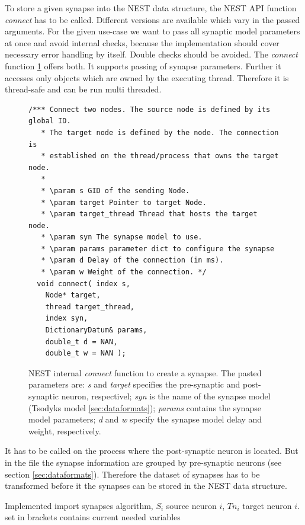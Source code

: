 To store a given synapse into the NEST data structure,
the NEST API function \emph{connect} has to be called.  
Different versions are available which vary in the passed arguments.
For the given use-case we want to pass all synaptic model parameters at once and
avoid internal checks, because the implementation should cover necessary error handling by 
itself. Double checks should be avoided.
The \emph{connect} function \ref{code:connect} offers both.
It supports passing of synapse parameters.
Further it accesses only objects which are owned by the executing thread. 
Therefore it is thread-safe and can be run multi threaded.
\begin{figure}[ht!]
\begin{lstlisting}[style=cppcode]
/*** Connect two nodes. The source node is defined by its global ID.
   * The target node is defined by the node. The connection is
   * established on the thread/process that owns the target node.
   *
   * \param s GID of the sending Node.
   * \param target Pointer to target Node.
   * \param target_thread Thread that hosts the target node.
   * \param syn The synapse model to use.
   * \param params parameter dict to configure the synapse
   * \param d Delay of the connection (in ms).
   * \param w Weight of the connection. */
  void connect( index s,
    Node* target,
    thread target_thread,
    index syn,
    DictionaryDatum& params,
    double_t d = NAN,
    double_t w = NAN );
\end{lstlisting}
\caption{NEST internal \emph{connect} function to create a synapse. The pasted parameters are:
\emph{s} and \emph{target} specifies the pre-synaptic and post-synaptic neuron, respectivel;
\emph{syn} is the name of the synapse model (Tsodyks model \ref{sec:dataformats});
\emph{params} contains the synapse model parameters;
\emph{d} and \emph{w} specify the synapse model delay and weight, respectively.}
\label{code:connect}
\end{figure}
It has to be called on the process where the post-synaptic neuron is located.
But in the file the synapse information are grouped by pre-synaptic neurons (see section \ref{sec:dataformats}).
Therefore the dataset of synapses has to be transformed before it the synapses can be stored in the NEST data structure.
\begin{algorithm}[ht!]
	\caption{Implemented import synapses algorithm, $S_i$ source neuron $i$, $Tn_i$ target neuron $i$.
	set in brackets contains current needed variables}
\label{alg2}
\end{algorithm}
